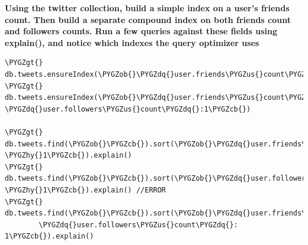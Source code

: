 \documentclass[a4paper,10pt,english]{sphinxmanual}
\def\PYGZus{\char`\_}
\def\PYGZob{\char`\{}
\def\PYGZcb{\char`\}}
\def\PYGZgt{\char`\>}
\def\PYGZhy{\char`\-}
\def\PYGZdq{\char`\"}
\begin{document}
\textbf{Using the twitter collection, build a simple index on a user's friends count. Then build a separate compound index on both friends count and followers counts. Run a few queries against these fields using explain(), and notice which indexes the query optimizer uses}

\begin{Verbatim}[commandchars=\\\{\}]
\PYGZgt{} db.tweets.ensureIndex(\PYGZob{}\PYGZdq{}user.friends\PYGZus{}count\PYGZdq{}:1\PYGZcb{})
\PYGZgt{} db.tweets.ensureIndex(\PYGZob{}\PYGZdq{}user.friends\PYGZus{}count\PYGZdq{}:1, \PYGZdq{}user.followers\PYGZus{}count\PYGZdq{}:1\PYGZcb{})

\PYGZgt{} db.tweets.find(\PYGZob{}\PYGZcb{}).sort(\PYGZob{}\PYGZdq{}user.friends\PYGZus{}count\PYGZdq{}: \PYGZhy{}1\PYGZcb{}).explain()
\PYGZgt{} db.tweets.find(\PYGZob{}\PYGZcb{}).sort(\PYGZob{}\PYGZdq{}user.followers\PYGZus{}count\PYGZdq{}: \PYGZhy{}1\PYGZcb{}).explain() //ERROR
\PYGZgt{} db.tweets.find(\PYGZob{}\PYGZcb{}).sort(\PYGZob{}\PYGZdq{}user.friends\PYGZus{}count\PYGZdq{}:1,
        \PYGZdq{}user.followers\PYGZus{}count\PYGZdq{}: 1\PYGZcb{}).explain()
\end{Verbatim}
\end{document}
